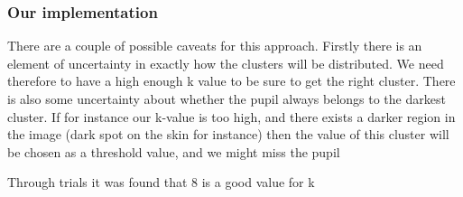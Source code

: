\subsubsection{Our implementation}

There are a couple of possible caveats for this approach. Firstly there
is an element of uncertainty in exactly how the clusters will be
distributed. We need therefore to have a high enough k value to be sure
to get the right cluster. There is also some uncertainty about whether
the pupil always belongs to the darkest cluster. If for instance our
k-value is too high, and there exists a darker region in the image (dark
spot on the skin for instance) then the value of this cluster will be
chosen as a threshold value, and we might miss the pupil

Through trials it was found that 8 is a good value for k
